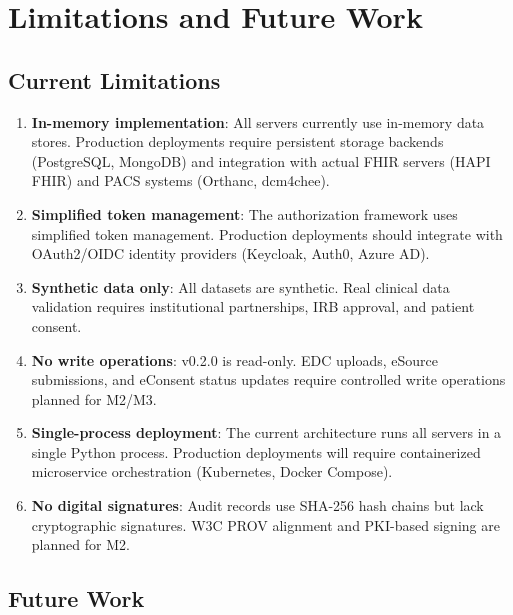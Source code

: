 \documentclass[10pt,letterpaper]{article}
\begin{document}
\section{Limitations and Future Work}

\subsection{Current Limitations}

\begin{enumerate}[leftmargin=2em]
    \item \textbf{In-memory implementation}: All servers currently use in-memory data stores. Production deployments require persistent storage backends (PostgreSQL, MongoDB) and integration with actual FHIR servers (HAPI FHIR) and PACS systems (Orthanc, dcm4chee).

    \item \textbf{Simplified token management}: The authorization framework uses simplified token management. Production deployments should integrate with OAuth2/OIDC identity providers (Keycloak, Auth0, Azure AD).

    \item \textbf{Synthetic data only}: All datasets are synthetic. Real clinical data validation requires institutional partnerships, IRB approval, and patient consent.

    \item \textbf{No write operations}: v0.2.0 is read-only. EDC uploads, eSource submissions, and eConsent status updates require controlled write operations planned for M2/M3.

    \item \textbf{Single-process deployment}: The current architecture runs all servers in a single Python process. Production deployments will require containerized microservice orchestration (Kubernetes, Docker Compose).

    \item \textbf{No digital signatures}: Audit records use SHA-256 hash chains but lack cryptographic signatures. W3C PROV alignment and PKI-based signing are planned for M2.
\end{enumerate}

\subsection{Future Work}
\end{document}
